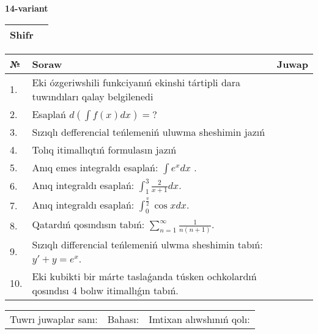 \documentclass{article}
\begin{document}
  \egroup
  
  \newpage
  
  
  \textbf{14-variant}\\
  
  \bgroup
  \def\arraystretch{1.6} %
  
  \begin{tabular}{|m{5.7cm}|m{9.5cm}|}
  \hline
  Shifr & \\
  \hline
  \end{tabular}
  
  \vspace{1cm}
  
  \begin{tabular}{|m{0.7cm}|m{10cm}|m{4cm}|}
  \hline
  № & Soraw & Juwap \\
  \hline
  1. & Eki ózgeriwshili funkciyanıń ekinshi tártipli dara tuwındıları qalay belgilenedi &  \\
  \hline
  2. & Esaplań \(d\left( \int{f(x)dx} \right) = ?\) &  \\
  \hline
  3. & Sızıqlı defferencial teńlemeniń uluwma sheshimin jazıń &  \\
  \hline
  4. & Tolıq itimallıqtıń formulasın jazıń &  \\
  \hline
  5. & Anıq emes integraldı esaplań: \(\int{e^{x}dx}\) . &  \\
  \hline
  6. & Anıq integraldı esaplań: \(\int_{1}^{3}\frac{2}{x + 1}dx\). &  \\
  \hline
  7. & Anıq integraldı esaplań: \(\int_{0}^{\frac{\pi}{2}}{\cos xdx}\). &  \\
  \hline
  8. & Qatardıń qosındısın tabıń: \(\sum_{n = 1}^{\infty}\frac{1}{n(n + 1)}\). &  \\
  \hline
  9. & Sızıqlı differencial teńlemeniń ulwma sheshimin tabıń: \(y' + y = e^{x}\). &  \\
  \hline
  10. & Eki kubikti bir márte taslaǵanda túsken ochkolardıń qosındısı 4 bolıw itimallıǵın tabıń. &  \\
  \hline
  \end{tabular}
  
  \vspace{1cm}
  
  \begin{tabular}{lll}
  Tuwrı juwaplar sanı: \underline{\hspace{1.5cm}} & 
  Bahası: \underline{\hspace{1.5cm}} & 
  Imtixan alıwshınıń qolı: \underline{\hspace{2cm}} \\
  \end{tabular}
  
\end{document}
